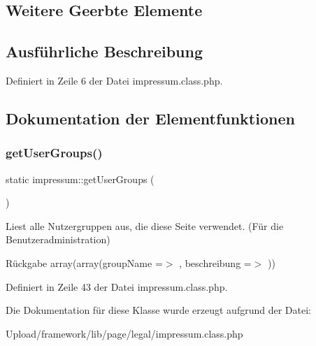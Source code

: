 \subsection*{Weitere Geerbte Elemente}


\subsection{Ausführliche Beschreibung}


Definiert in Zeile 6 der Datei impressum.\+class.\+php.



\subsection{Dokumentation der Elementfunktionen}
\mbox{\label{classimpressum_aac4e795eeccde87b39cf3312f85a1b86}} 
\subsubsection{\texorpdfstring{get\+User\+Groups()}{getUserGroups()}}
{\footnotesize\ttfamily static impressum\+::get\+User\+Groups (\begin{DoxyParamCaption}{ }\end{DoxyParamCaption})\hspace{0.3cm}{\ttfamily [static]}}

Liest alle Nutzergruppen aus, die diese Seite verwendet. (Für die Benutzeradministration) \begin{DoxyReturn}{Rückgabe}
array(array(\textquotesingle{}group\+Name\textquotesingle{} =$>$ \textquotesingle{}\textquotesingle{}, \textquotesingle{}beschreibung\textquotesingle{} =$>$ \textquotesingle{}\textquotesingle{})) 
\end{DoxyReturn}


Definiert in Zeile 43 der Datei impressum.\+class.\+php.



Die Dokumentation für diese Klasse wurde erzeugt aufgrund der Datei\+:\begin{DoxyCompactItemize}
\item 
Upload/framework/lib/page/legal/impressum.\+class.\+php\end{DoxyCompactItemize}
